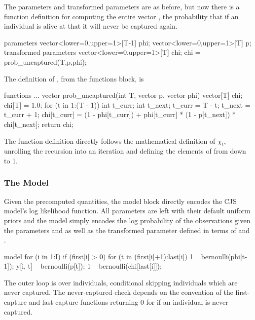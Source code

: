 The parameters and transformed parameters are as before, but now there
is a function definition for computing the entire vector , the
probability that if an individual is alive at  that it will
never be captured again.
%
\begin{stancode}
parameters {
  vector<lower=0,upper=1>[T-1] phi;
  vector<lower=0,upper=1>[T] p;
}
transformed parameters {
  vector<lower=0,upper=1>[T] chi;
  chi = prob_uncaptured(T,p,phi);
}
\end{stancode}
%
The definition of , from the functions block,
is
%
\begin{stancode}
functions {
  ...
  vector prob_uncaptured(int T, vector p, vector phi) {
    vector[T] chi;
    chi[T] = 1.0;              
    for (t in 1:(T - 1)) {
      int t_curr;
      int t_next;
      t_curr = T - t;
      t_next = t_curr + 1;
      chi[t_curr] = (1 - phi[t_curr]) 
                     + phi[t_curr] 
                       * (1 - p[t_next]) 
                       * chi[t_next]; 
    }
    return chi;
  }
}
\end{stancode}
%
The function definition directly follows the mathematical definition
of $\chi_t$, unrolling the recursion into an iteration and
defining the elements of  from  down to 1.

\subsubsection{The Model}

Given the precomputed quantities, the model block directly encodes the
CJS model's log likelihood function.  All parameters are left with
their default uniform priors and the model simply encodes the log
probability of the observations  given the parameters 
and  as well as the transformed parameter  defined
in terms of  and .
%
\begin{stancode}
model {
  for (i in 1:I) {
    if (first[i] > 0) {
      for (t in (first[i]+1):last[i]) {
        1 ~ bernoulli(phi[t-1]);
        y[i, t] ~ bernoulli(p[t]);
      }
      1 ~ bernoulli(chi[last[i]]);
    }
  }
}
\end{stancode}
%
The outer loop is over individuals, conditional skipping individuals
 which are never captured.  The never-captured check depends
on the convention of the first-capture and last-capture functions
returning 0 for  if an individual is never captured.

